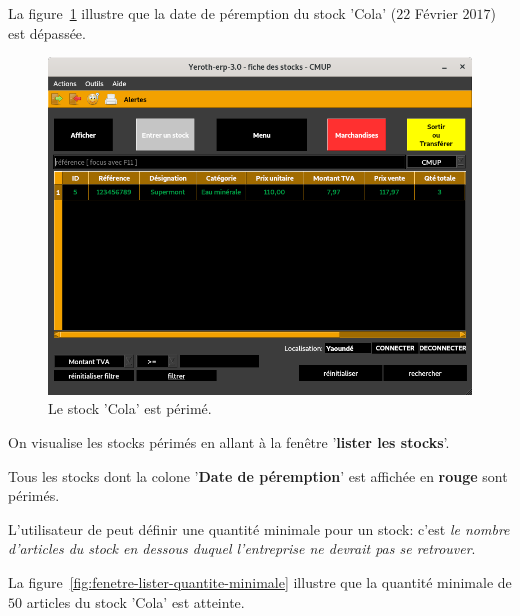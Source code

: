 La figure~\ref{fig:fenetre-lister-stock-perime} illustre
que la date de p\'eremption du stock 'Cola' ($22$ F\'evrier
$2017$) est d\'epass\'ee.\\

\begin{figure}[!htbp]
	\centering
	\includegraphics[scale=0.63]{images/yeren-fenetre-stocks-perimes.png}
	\caption{Le stock 'Cola' est p\'erim\'e.}
	\label{fig:fenetre-lister-stock-perime}
\end{figure}

On visualise les stocks p\'erim\'es en allant \`a la fen\^etre
'\textbf{lister les stocks}'. 

Tous les stocks dont la colone '\textbf{Date de
	p\'eremption}' est affich\'ee en 
\textbf{\textcolor{firebrickred}{rouge}} sont p\'erim\'es.


\newpage
{}

L'utilisateur de \yeren peut d\'efinir une quantit\'e minimale
pour un stock: c'est \emph{le nombre d'articles du stock en dessous
duquel l'entreprise ne devrait pas se retrouver}.

La figure~\ref{fig:fenetre-lister-quantite-minimale} illustre
que la quantit\'e minimale de $50$ articles du stock 'Cola'
est atteinte.\\

